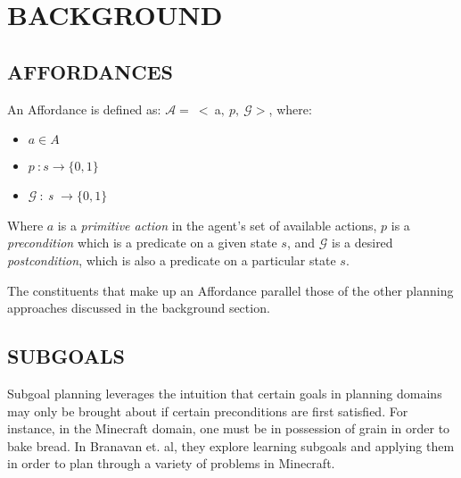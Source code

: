 \section{BACKGROUND}

\subsection{AFFORDANCES}


An Affordance is defined as: $\mathcal{A} =\ <\ $a$ ,\ p,\ \mathcal{G}>$, where:

\begin{itemize}
\item[] $a \in A$
\item[] $p\ : s \rightarrow \{0,1\}$
\item[] $ \mathcal{G}\ :\ ${\it s }$ \rightarrow \{$0$,1\}$
\end{itemize}

Where $a$ is a {\it primitive action} in the agent's set of available actions, $p$ is a {\it precondition} which is a predicate on a given state $s$, and $\mathcal{G}$ is a desired {\it postcondition}, which is also a predicate on a particular state $s$.

The constituents that make up an Affordance parallel those of the other planning approaches discussed in the background section.

\subsection{SUBGOALS}
Subgoal planning leverages the intuition that certain goals in planning domains may only be brought about if certain preconditions are first satisfied. For instance, in the Minecraft domain, one must be in possession of grain in order to bake bread. In Branavan et. al, they explore learning subgoals and applying them in order to plan through a variety of problems in Minecraft.

